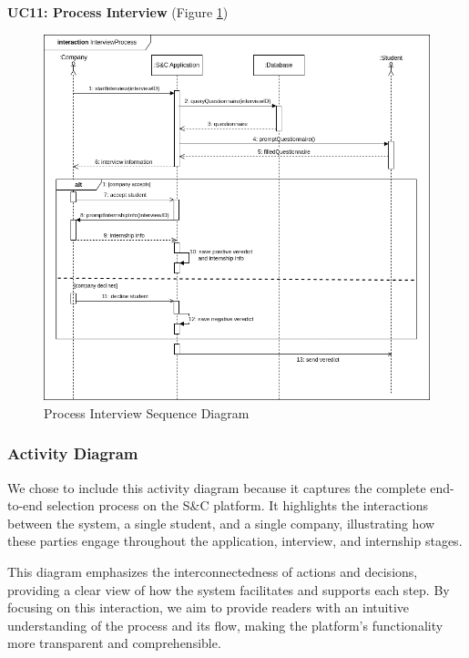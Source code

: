 \textbf{UC11: Process Interview} (Figure \ref{fig:process_sequence})
\begin{figure}[H]
\centering
\includegraphics[width=\textwidth]{Images/interview_process_sequence.png}
\caption{\label{fig:process_sequence} Process Interview Sequence Diagram}
\end{figure}

\subsubsection{Activity Diagram}
We chose to include this activity diagram because it captures the complete end-to-end selection process on the S\&C platform. It highlights the interactions between the system, a single student, and a single company, illustrating how these parties engage throughout the application, interview, and internship stages.

This diagram emphasizes the interconnectedness of actions and decisions, providing a clear view of how the system facilitates and supports each step. By focusing on this interaction, we aim to provide readers with an intuitive understanding of the process and its flow, making the platform's functionality more transparent and comprehensible.

